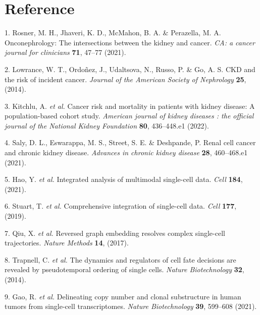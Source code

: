 \documentclass[
]{article}
\newenvironment{cslreferences}%
  {}%
  {\par}
\begin{document}
\hypertarget{bibliography}{%
\section*{Reference}\label{bibliography}}

\hypertarget{refs}{}
\begin{cslreferences}
\leavevmode\hypertarget{ref-OnconephrologyRosner2021}{}%
1. Rosner, M. H., Jhaveri, K. D., McMahon, B. A. \& Perazella, M. A. Onconephrology: The intersections between the kidney and cancer. \emph{CA: a cancer journal for clinicians} \textbf{71}, 47--77 (2021).

\leavevmode\hypertarget{ref-CkdAndTheRisLowran2014}{}%
2. Lowrance, W. T., Ordoñez, J., Udaltsova, N., Russo, P. \& Go, A. S. CKD and the risk of incident cancer. \emph{Journal of the American Society of Nephrology} \textbf{25}, (2014).

\leavevmode\hypertarget{ref-CancerRiskAndKitchl2022}{}%
3. Kitchlu, A. \emph{et al.} Cancer risk and mortality in patients with kidney disease: A population-based cohort study. \emph{American journal of kidney diseases : the official journal of the National Kidney Foundation} \textbf{80}, 436--448.e1 (2022).

\leavevmode\hypertarget{ref-RenalCellCancSaly2021}{}%
4. Saly, D. L., Eswarappa, M. S., Street, S. E. \& Deshpande, P. Renal cell cancer and chronic kidney disease. \emph{Advances in chronic kidney disease} \textbf{28}, 460--468.e1 (2021).

\leavevmode\hypertarget{ref-IntegratedAnalHaoY2021}{}%
5. Hao, Y. \emph{et al.} Integrated analysis of multimodal single-cell data. \emph{Cell} \textbf{184}, (2021).

\leavevmode\hypertarget{ref-ComprehensiveIStuart2019}{}%
6. Stuart, T. \emph{et al.} Comprehensive integration of single-cell data. \emph{Cell} \textbf{177}, (2019).

\leavevmode\hypertarget{ref-ReversedGraphQiuX2017}{}%
7. Qiu, X. \emph{et al.} Reversed graph embedding resolves complex single-cell trajectories. \emph{Nature Methods} \textbf{14}, (2017).

\leavevmode\hypertarget{ref-TheDynamicsAnTrapne2014}{}%
8. Trapnell, C. \emph{et al.} The dynamics and regulators of cell fate decisions are revealed by pseudotemporal ordering of single cells. \emph{Nature Biotechnology} \textbf{32}, (2014).

\leavevmode\hypertarget{ref-DelineatingCopGaoR2021}{}%
9. Gao, R. \emph{et al.} Delineating copy number and clonal substructure in human tumors from single-cell transcriptomes. \emph{Nature Biotechnology} \textbf{39}, 599--608 (2021).


\end{cslreferences}
\end{document}
